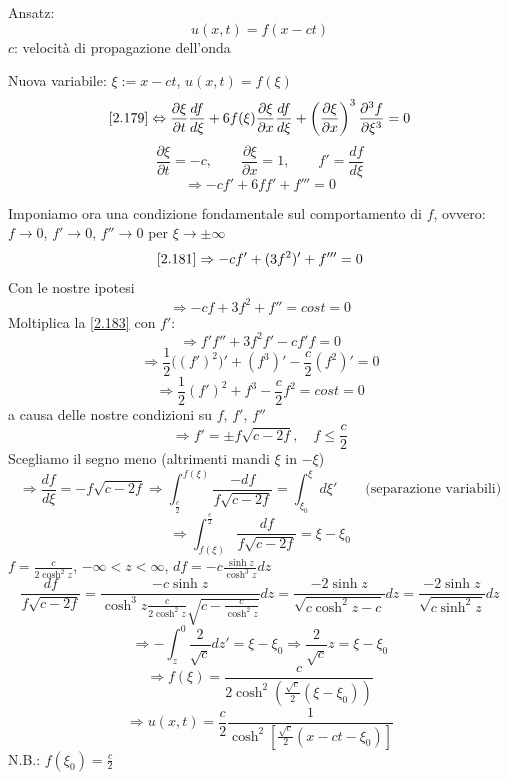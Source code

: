 \documentclass[a4paper,11pt]{report}
\begin{document}
Ansatz: 
\begin{equation}
u(x,t)=f(x-ct)
\label{2.180}
\end{equation}
$c$: velocit\`a di propagazione dell'onda

Nuova variabile: $\xi:= x-ct$, $u(x,t)=f(\xi)$
\[
\eqref{2.179} \Leftrightarrow \frac{\partial \xi}{\partial t}\frac{df}{d\xi}+6f(\xi)\frac{\partial \xi}{\partial x}\frac{df}{d\xi}+ \left(\frac{\partial \xi}{\partial x}  \right)^3\frac{\partial^3 f}{\partial \xi ^3}=0
\]
\[
\frac{\partial \xi}{\partial t}=-c, \qquad \frac{\partial \xi}{\partial x}=1, \qquad f'=\frac{df}{d\xi}
\]
\begin{equation}
\Rightarrow -cf' + 6ff' + f'''=0
\label{2.181}
\end{equation}

Imponiamo ora una condizione fondamentale sul comportamento di $f$, ovvero: $f\to 0$, $f'\to 0$, $f''\to 0$ per $\xi \to \pm \infty$
\begin{equation}
\eqref{2.181}\Rightarrow -cf' + (3f^2)' + f'''=0
\label{2.182}
\end{equation}
Con le nostre ipotesi
\begin{equation}
\Rightarrow -cf + 3f^2 + f''=cost=0 
\label{2.183}
\end{equation}
Moltiplica la \eqref{2.183} con $f'$:
\[
\Rightarrow f'f'' + 3f^2f'-cf'f=0 
\]
\begin{equation}
\Rightarrow \frac{1}{2} \big((f')^2\big)' + (f^3)' - \frac{c}{2}(f^2)'=0
\label{2.184}
\end{equation}
\[
\Rightarrow \frac{1}{2}(f')^2+f^3-\frac{c}{2}f^2 = cost=0
\]
a causa delle nostre condizioni su $f$, $f'$, $f''$
\begin{equation}
\Rightarrow f'=\pm f\sqrt{c-2f}, \quad f\le \frac{c}{2}
\label{2.185}
\end{equation}
Scegliamo il segno meno (altrimenti mandi $\xi$ in $-\xi$)
\[
\Rightarrow \frac{df}{d\xi}=-f\sqrt{c-2f}\Rightarrow\int_{\frac{c}{2}}^{f(\xi)}\frac{-df}{f\sqrt{c-2f}}=\int_{\xi_0}^{\xi}d\xi' \qquad \text{(separazione variabili)}
\]
\[
\Rightarrow\int_{f(\xi)}^{\frac{c}{2}}\frac{df}{f\sqrt{c-2f}}=\xi - \xi_0
\]
$f=\frac{c}{2\cosh^2 z}$, $-\infty<z<\infty$, $df=-c\frac{\sinh z}{\cosh^3 z}dz$
\[
\frac{df}{f\sqrt{c-2f}}=\frac{-c \sinh z}{\cosh^3 z\frac{c}{2\cosh^2z}\sqrt{c-\frac{c}{\cosh^2 z}}}dz=\frac{-2\sinh z}{\sqrt{c\cosh^2z - c}}dz=\frac{-2\sinh z}{\sqrt{c\sinh^2 z}}dz
\]
\[
\Rightarrow - \int_z^0 \frac{2}{\sqrt{c}}dz'=\xi - \xi_0 \Rightarrow\frac{2}{\sqrt{c}}z=\xi - \xi_0
\]
\[
\Rightarrow f(\xi)=\frac{c}{2\cosh^2 \left(\frac{\sqrt{c}}{2}(\xi-\xi_0)\right)}
\]
\[
\Rightarrow u(x,t)=\frac{c}{2}\frac{1}{\cosh^2 \left[\frac{\sqrt{c}}{2}(x-ct-\xi_0)\right]}
\]
N.B.: $f(\xi_0)=\frac{c}{2}$
\end{document}
